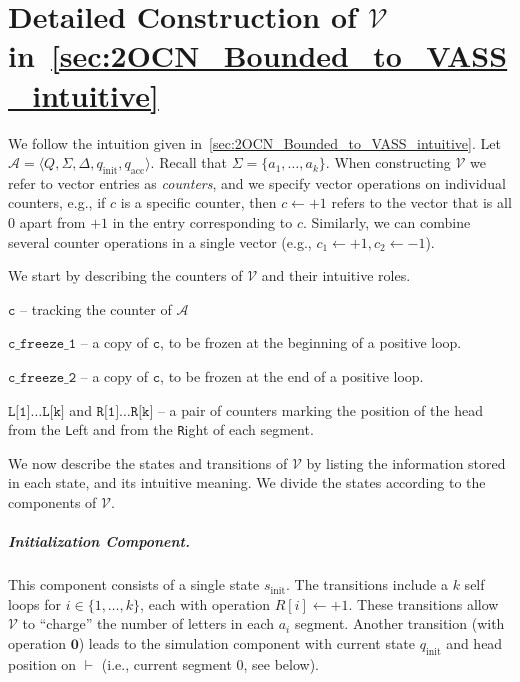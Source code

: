 \documentclass[11pt,a4paper]{amsart}
\theoremstyle{definition}
\newcommand{\tup}[1]{\langle #1 \rangle}
\newcommand{\lmark}{\vdash}
\newcommand{\initstate}{q_{\mathrm{init}}}
\newcommand{\accstate}{q_{\mathrm{acc}}}
\renewcommand{\vec}[1]{\boldsymbol{#1}}
\newcommand{\adds}[1]{\leftarrow #1}
\newcommand{\vf}[1]{\texttt{#1}}
\newcommand{\cA}{\mathcal{A}}
\newcommand{\cV}{\mathcal{V}}
\begin{document}
\newpage
\appendix

\section{Detailed Construction of $\cV$ in~\cref{sec:2OCN_Bounded_to_VASS_intuitive}}
\label{apx:2OCN_Bounded_to_VASS_formal} 
\label{sec:2OCN_Bounded_to_VASS_formal} 
We follow the intuition given in~\cref{sec:2OCN_Bounded_to_VASS_intuitive}. 
Let $\cA=\tup{Q,\Sigma,\Delta,\initstate,\accstate}$. Recall that $\Sigma=\{a_1,\ldots,a_k\}$. When
constructing $\cV$ we refer to vector entries as \emph{counters}, and we specify
vector operations on individual counters, e.g., if $c$ is a specific counter,
then $c\adds{+1}$ refers to the vector that is all $0$ apart from $+1$ in the
entry corresponding to $c$. Similarly, we can combine several counter operations
in a single vector (e.g., $c_1\adds{+1}, c_2\adds{-1}$).

We start by describing the counters of $\cV$ and their intuitive roles.
\begin{compactitem}
\item $\vf{c}$ -- tracking the counter of $\cA$
\item $\vf{c\_freeze\_1}$ -- a copy of $\vf{c}$, to be frozen at the
beginning of a positive loop.
\item $\vf{c\_freeze\_2}$ -- a copy of $\vf{c}$, to be frozen at the end of a
positive loop.
\item $\vf{L[1]}\ldots\vf{L[k]}$ and $\vf{R[1]}\ldots\vf{R[k]}$ -- a pair of counters
marking the position of the head from the \vf{L}eft and from the \vf{R}ight
of each segment.
\end{compactitem}

We now describe the states and transitions of $\cV$ by listing the information
stored in each state, and its intuitive meaning. We divide the states according
to the components of $\cV$.
\subparagraph*{Initialization Component.} This component consists of a single
state $s_{\textrm{init}}$. The transitions include a $k$ self loops for
$i\in \{1,\ldots,k\}$, each with operation $R[i]\adds{+1}$. These transitions allow
$\cV$ to ``charge'' the number of letters in each $a_i$ segment.  Another
transition (with operation $\vec{0}$) leads to the simulation component with
current state $\initstate$ and head position on $\lmark$ (i.e., current segment
$0$, see below).
\end{document}

